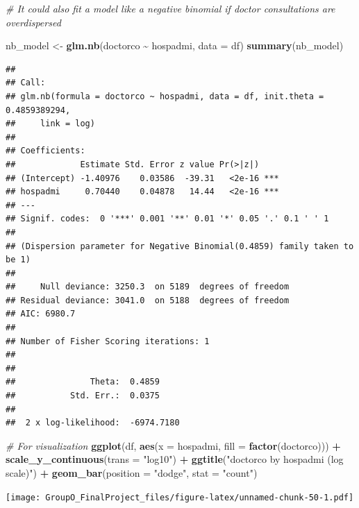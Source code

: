 \documentclass[
]{article}
\newenvironment{Shaded}{\begin{snugshade}}{\end{snugshade}}
\newcommand{\AttributeTok}[1]{\textcolor[rgb]{0.13,0.29,0.53}{#1}}
\newcommand{\CommentTok}[1]{\textcolor[rgb]{0.56,0.35,0.01}{\textit{#1}}}
\newcommand{\FunctionTok}[1]{\textcolor[rgb]{0.13,0.29,0.53}{\textbf{#1}}}
\newcommand{\NormalTok}[1]{#1}
\newcommand{\OtherTok}[1]{\textcolor[rgb]{0.56,0.35,0.01}{#1}}
\newcommand{\SpecialCharTok}[1]{\textcolor[rgb]{0.81,0.36,0.00}{\textbf{#1}}}
\newcommand{\StringTok}[1]{\textcolor[rgb]{0.31,0.60,0.02}{#1}}
\begin{document}
\begin{Shaded}
\begin{Highlighting}[]
\CommentTok{\# It could also fit a model like a negative binomial if doctor consultations are overdispersed}

\NormalTok{nb\_model }\OtherTok{\textless{}{-}} \FunctionTok{glm.nb}\NormalTok{(doctorco }\SpecialCharTok{\textasciitilde{}}\NormalTok{ hospadmi, }\AttributeTok{data =}\NormalTok{ df)}
\FunctionTok{summary}\NormalTok{(nb\_model)}
\end{Highlighting}
\end{Shaded}

\begin{verbatim}
## 
## Call:
## glm.nb(formula = doctorco ~ hospadmi, data = df, init.theta = 0.4859389294, 
##     link = log)
## 
## Coefficients:
##             Estimate Std. Error z value Pr(>|z|)    
## (Intercept) -1.40976    0.03586  -39.31   <2e-16 ***
## hospadmi     0.70440    0.04878   14.44   <2e-16 ***
## ---
## Signif. codes:  0 '***' 0.001 '**' 0.01 '*' 0.05 '.' 0.1 ' ' 1
## 
## (Dispersion parameter for Negative Binomial(0.4859) family taken to be 1)
## 
##     Null deviance: 3250.3  on 5189  degrees of freedom
## Residual deviance: 3041.0  on 5188  degrees of freedom
## AIC: 6980.7
## 
## Number of Fisher Scoring iterations: 1
## 
## 
##               Theta:  0.4859 
##           Std. Err.:  0.0375 
## 
##  2 x log-likelihood:  -6974.7180
\end{verbatim}

\begin{Shaded}
\begin{Highlighting}[]
\CommentTok{\# For visualization}
\FunctionTok{ggplot}\NormalTok{(df, }\FunctionTok{aes}\NormalTok{(}\AttributeTok{x =}\NormalTok{ hospadmi, }\AttributeTok{fill =} \FunctionTok{factor}\NormalTok{(doctorco))) }\SpecialCharTok{+} 
  \FunctionTok{scale\_y\_continuous}\NormalTok{(}\AttributeTok{trans =} \StringTok{"log10"}\NormalTok{) }\SpecialCharTok{+}
  \FunctionTok{ggtitle}\NormalTok{(}\StringTok{"\textquotesingle{}doctorco\textquotesingle{} by \textquotesingle{}hospadmi\textquotesingle{} (log scale)"}\NormalTok{) }\SpecialCharTok{+}
  \FunctionTok{geom\_bar}\NormalTok{(}\AttributeTok{position =} \StringTok{"dodge"}\NormalTok{, }\AttributeTok{stat =} \StringTok{"count"}\NormalTok{)}
\end{Highlighting}
\end{Shaded}

\texttt{[image: GroupO\_FinalProject\_files/figure-latex/unnamed-chunk-50-1.pdf]}
\end{document}
